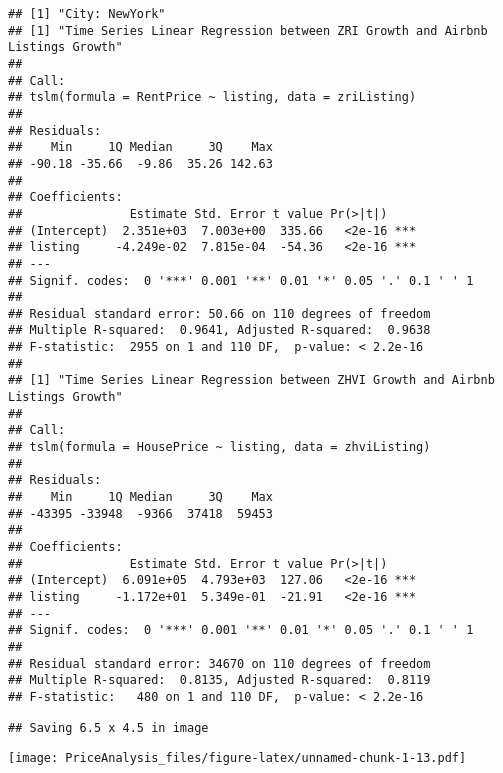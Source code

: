 \documentclass[
]{article}
\begin{document}
\begin{verbatim}
## [1] "City: NewYork"
## [1] "Time Series Linear Regression between ZRI Growth and Airbnb Listings Growth"
## 
## Call:
## tslm(formula = RentPrice ~ listing, data = zriListing)
## 
## Residuals:
##    Min     1Q Median     3Q    Max 
## -90.18 -35.66  -9.86  35.26 142.63 
## 
## Coefficients:
##               Estimate Std. Error t value Pr(>|t|)    
## (Intercept)  2.351e+03  7.003e+00  335.66   <2e-16 ***
## listing     -4.249e-02  7.815e-04  -54.36   <2e-16 ***
## ---
## Signif. codes:  0 '***' 0.001 '**' 0.01 '*' 0.05 '.' 0.1 ' ' 1
## 
## Residual standard error: 50.66 on 110 degrees of freedom
## Multiple R-squared:  0.9641, Adjusted R-squared:  0.9638 
## F-statistic:  2955 on 1 and 110 DF,  p-value: < 2.2e-16
## 
## [1] "Time Series Linear Regression between ZHVI Growth and Airbnb Listings Growth"
## 
## Call:
## tslm(formula = HousePrice ~ listing, data = zhviListing)
## 
## Residuals:
##    Min     1Q Median     3Q    Max 
## -43395 -33948  -9366  37418  59453 
## 
## Coefficients:
##               Estimate Std. Error t value Pr(>|t|)    
## (Intercept)  6.091e+05  4.793e+03  127.06   <2e-16 ***
## listing     -1.172e+01  5.349e-01  -21.91   <2e-16 ***
## ---
## Signif. codes:  0 '***' 0.001 '**' 0.01 '*' 0.05 '.' 0.1 ' ' 1
## 
## Residual standard error: 34670 on 110 degrees of freedom
## Multiple R-squared:  0.8135, Adjusted R-squared:  0.8119 
## F-statistic:   480 on 1 and 110 DF,  p-value: < 2.2e-16
\end{verbatim}

\begin{verbatim}
## Saving 6.5 x 4.5 in image
\end{verbatim}

\texttt{[image: PriceAnalysis\_files/figure-latex/unnamed-chunk-1-13.pdf]}
\end{document}
